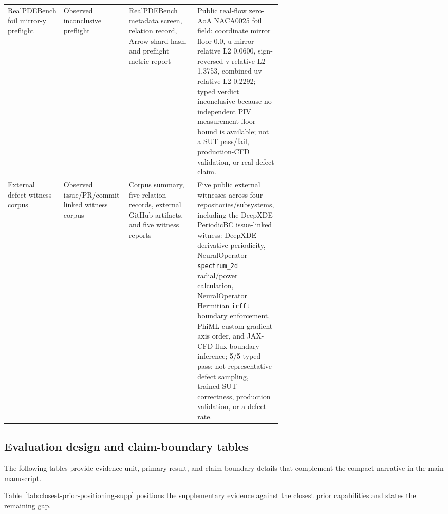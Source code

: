 \documentclass[preprint,12pt]{elsarticle}
\begin{document}
{\begin{xltabular}{\linewidth}{@{}>{\raggedright\arraybackslash}p{0.19\linewidth}>{\raggedright\arraybackslash}p{0.18\linewidth}>{\raggedright\arraybackslash}p{0.25\linewidth}Y@{}}
RealPDE\-Bench foil mirror-y preflight & Observed inconclusive preflight & RealPDE\-Bench metadata screen, relation record, Arrow shard hash, and preflight metric report & Public real-flow zero-AoA NACA0025 foil field: coordinate mirror floor 0.0, u mirror relative L2 0.0600, sign-reversed-v relative L2 1.3753, combined uv relative L2 0.2292; typed verdict inconclusive because no independent PIV measurement-floor bound is available; not a SUT pass/fail, production-CFD validation, or real-defect claim. \\
External defect-witness corpus & Observed issue/PR/commit-linked witness corpus & Corpus summary, five relation records, external GitHub artifacts, and five witness reports & Five public external witnesses across four repositories/subsystems, including the DeepXDE PeriodicBC issue-linked witness: DeepXDE derivative periodicity, NeuralOperator \texttt{spectrum\_2d} radial/power calculation, NeuralOperator Hermitian \texttt{irfft} boundary enforcement, PhiML custom-gradient axis order, and JAX-CFD flux-boundary inference; 5/5 typed pass; not representative defect sampling, trained-SUT correctness, production validation, or a defect rate. \\
\end{xltabular}
}

\subsection{Evaluation design and claim-boundary tables}
\label{app:evaluation-design-claim-boundaries}

The following tables provide evidence-unit, primary-result, and claim-boundary details that complement the compact narrative in the main manuscript.

Table~\ref{tab:closest-prior-positioning-supp} positions the supplementary
evidence against the closest prior capabilities and states the remaining gap.
\end{document}
